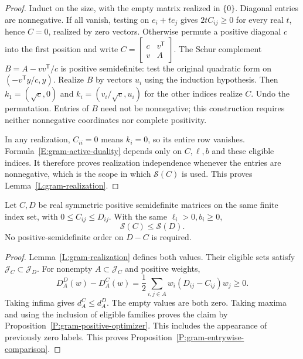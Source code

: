 \begin{proof}
  Induct on the size, with the empty matrix realized in $\{0\}$.
  Diagonal entries are nonnegative.
  If all vanish, testing on $e_i+t e_j$ gives $2tC_{ij}\ge0$ for
  every real $t$, hence $C=0$, realized by zero vectors.
  Otherwise permute a positive diagonal $c$ into the first position
  and write $C=\left[\begin{smallmatrix}c&v^{\mathsf T}\\v&A\end{smallmatrix}\right]$.
  The Schur complement $B=A-vv^{\mathsf T}/c$ is positive semidefinite:
  test the original quadratic form on $(-v^{\mathsf T}y/c,y)$.
  Realize $B$ by vectors $u_i$ using the induction hypothesis.
  Then $k_1=(\sqrt c,0)$ and
  $k_i=(v_i/\sqrt c,u_i)$ for the other indices realize $C$.
  Undo the permutation.
  Entries of $B$ need not be nonnegative; this construction requires
  neither nonnegative coordinates nor complete positivity.

  In any realization, $C_{ii}=0$ means $k_i=0$, so its entire row
  vanishes. Formula~\eqref{E:gram-active-duality} depends only on
  $C,\ell,b$ and these eligible indices. It therefore proves
  realization independence whenever the entries are nonnegative,
  which is the scope in which $\mathscr S(C)$ is used.
  This proves Lemma~\ref{L:gram-realization}.
\end{proof}

\begin{proposition}\label{P:gram-entrywise-comparison}
  Let $C,D$ be real symmetric positive semidefinite matrices on the
  same finite index set, with $0\le C_{ij}\le D_{ij}$.
  With the same $\ell_i>0,b_i\ge0$,
  \[
    \mathscr S(C)\le\mathscr S(D).
  \]
  No positive-semidefinite order on $D-C$ is required.
\end{proposition}

\begin{proof}
  Lemma~\ref{L:gram-realization} defines both values.
  Their eligible sets satisfy $\mathcal J_C\subset\mathcal J_D$.
  For nonempty $A\subset\mathcal J_C$ and positive weights,
  \[
    D_A^D(w)-D_A^C(w)
    =\frac12\sum_{i,j\in A}w_i(D_{ij}-C_{ij})w_j\ge0.
  \]
  Taking infima gives $d_A^C\le d_A^D$.
  The empty values are both zero.
  Taking maxima and using the inclusion of eligible families proves
  the claim by Proposition~\ref{P:gram-positive-optimizer}.
  This includes the appearance of previously zero labels.
  This proves Proposition~\ref{P:gram-entrywise-comparison}.
\end{proof}

